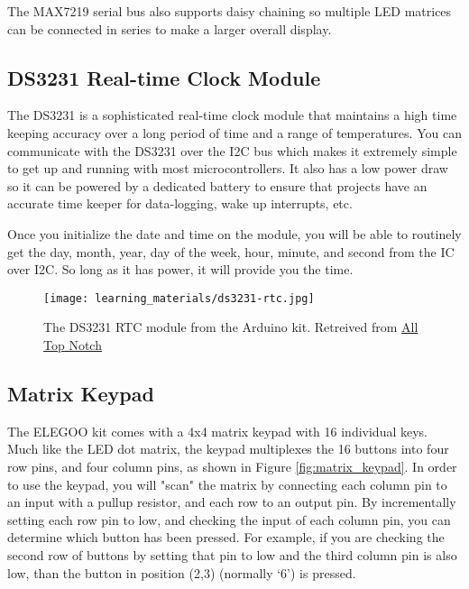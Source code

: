     The MAX7219 serial bus also supports daisy chaining so multiple LED matrices can be connected in series to make a larger overall display.

    \subsection*{DS3231 Real-time Clock Module}
    The DS3231 is a sophisticated real-time clock module that maintains a high time keeping accuracy over a long period of time and a range of temperatures.
    You can communicate with the DS3231 over the I2C bus which makes it extremely simple to get up and running with most microcontrollers.
    It also has a low power draw so it can be powered by a dedicated battery to ensure that projects have an accurate time keeper for data-logging, wake up interrupts, etc.

    Once you initialize the date and time on the module, you will be able to routinely get the day, month, year, day of the week, hour, minute, and second from the IC over I2C. So long as it has power, it will provide you the time.

    \begin{figure}[h]
        \texttt{[image: learning\_materials/ds3231-rtc.jpg]}
        \caption[DS3231 RTC Module]{The DS3231 RTC module from the Arduino kit. 
        Retreived from \href{https://alltopnotch.co.uk/wp-content/uploads/imported/9/RTC-Real-Time-Clock-DS3231-I2C-AT24C32-Board-Module-Arduino-ARM-PIC-UK-Seller-361515587149-4.JPG}
        {All Top Notch}}
    \end{figure}

    \subsection*{Matrix Keypad}
    The ELEGOO kit comes with a 4x4 matrix keypad with 16 individual keys.
    Much like the LED dot matrix, the keypad multiplexes the 16 buttons into four row pins, and four column pins, as shown in Figure \ref{fig:matrix_keypad}.
    In order to use the keypad, you will "scan" the matrix by connecting each column pin to an input with a pullup resistor, and each row to an output pin.
    By incrementally setting each row pin to low, and checking the input of each column pin, you can determine which button has been pressed.
    For example, if you are checking the second row of buttons by setting that pin to low and the third column pin is also low, than the button in position (2,3) (normally `6') is pressed.

